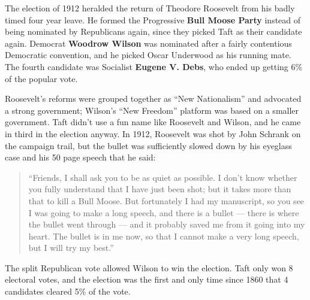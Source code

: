 The election of 1912 heralded the return of Theodore Roosevelt from his badly timed four year leave.
He formed the Progressive \textbf{Bull Moose Party} instead of being nominated by Republicans again,
since they picked Taft as their candidate again.
Democrat \textbf{Woodrow Wilson} was nominated after a fairly contentious Democratic convention,
and he picked Oscar Underwood as his running mate.
The fourth candidate was Socialist \textbf{Eugene V. Debs}, who ended up getting 6\% of the popular vote.

Roosevelt's reforms were grouped together as ``New Nationalism'' and advocated a strong government;
Wilson's ``New Freedom'' platform was based on a smaller government.
Taft didn't use a fun name like Roosevelt and Wilson, and he came in third in the election anyway.
In 1912, Roosevelt was shot by John Schrank on the campaign trail,
but the bullet was sufficiently slowed down by his eyeglass case and his 50 page speech that he said:

\begin{quotation}
  ``Friends, I shall ask you to be as quiet as possible.
  I don't know whether you fully understand that I have just been shot;
  but it takes more than that to kill a Bull Moose.
  But fortunately I had my manuscript, so you see I was going to make a long speech, and there is a bullet ---
  there is where the bullet went through --- and it probably saved me from it going into my heart.
  The bullet is in me now, so that I cannot make a very long speech, but I will try my best.''
\end{quotation}

The split Republican vote allowed Wilson to win the election.
Taft only won 8 electoral votes,
and the election was the first and only time since 1860 that 4 candidates cleared 5\% of the vote.

